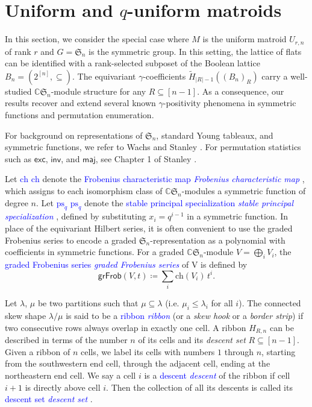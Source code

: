\documentclass[reqno]{amsart}
\newcommand{\defin}[1]{%
\relax\ifmmode%
\textcolor{blue}{#1}%
\else\textcolor{blue}{\emph{#1}}%
\fi%
}
\newcommand{\inv}{{\mathsf{inv}}}
\newcommand{\exc}{{\mathsf{exc}}}
\newcommand{\maj}{{\mathsf{maj}}}
\newcommand{\ch}{{\mathrm{ch}}}
\newcommand{\ps}{{\mathrm{ps}_q}}
\newcommand{\grFrob}{{\mathsf{grFrob}}}
\theoremstyle{definition}
\theoremstyle{remark}
\begin{document}
\section{Uniform and $q$-uniform matroids} \label{sec:Uniform}
In this section, we consider the special case where $M$ is the uniform matroid $U_{r,n}$ of rank $r$ and $G=\mathfrak{S}_n$ is the symmetric group. In this setting, the lattice of flats can be identified with a rank-selected subposet of the Boolean lattice $B_n=(2^{[n]},\subseteq)$.
The equivariant $\gamma$-coefficients $\tilde{H}_{|R|-1}((B_n)_R)$ carry a well-studied $\mathbb{C}\mathfrak{S}_n$-module structure for any $R\subseteq [n-1]$.
As a consequence, our results recover and extend several known $\gamma$-positivity phenomena in symmetric functions and permutation enumeration.


For background on representations of $\mathfrak{S}_n$, standard Young tableaux, and symmetric functions, we refer to Wachs \cite{WachsTool2007} and Stanley \cite{StanleyEC2}.
For permutation statistics such as $\exc$, $\inv$, and $\maj$, see Chapter 1 of Stanley \cite{StanleyEC1}.

Let \defin{$\ch$} denote the \defin{Frobenius characteristic map}, which assigns to each isomorphism class of $\mathbb{C}\mathfrak{S}_n$-modules a symmetric function of degree $n$. Let \defin{$\ps$} denote the \defin{stable principal specialization}, defined by substituting $x_i = q^{i-1}$ in a symmetric function.
In place of the equivariant Hilbert series, it is often convenient to use the graded Frobenius series to encode a graded $\mathfrak{S}_n$-representation as a polynomial with coefficients in symmetric functions. For a graded $\mathbb{C}\mathfrak{S}_n$-module $V=\bigoplus_i V_i$, the \defin{graded Frobenius series} of V is defined by
\[
\grFrob(V,t)\coloneqq \sum_i \ch(V_i)\, t^i.
\]

Let $\lambda$, $\mu$ be two partitions such that $\mu\subseteq\lambda$ (i.e. $\mu_i\le \lambda_i$ for all $i$). The connected skew shape $\lambda/\mu$ is said to be a \defin{ribbon} (or a \emph{skew hook} or a \emph{border strip}) if two consecutive rows always overlap in exactly one cell. A ribbon $H_{R,n}$ can be described in terms of the number $n$ of its cells and its \emph{descent set} $R\subseteq [n-1]$. Given a ribbon of $n$ cells, we label its cells with numbers $1$ through $n$, starting from the southwestern end cell, through the adjacent cell, ending at the northeastern end cell. We say a cell $i$ is a \defin{descent} of the ribbon if cell $i+1$ is directly above cell $i$. Then the collection of all its descents is called its \defin{descent set}.
\end{document}

